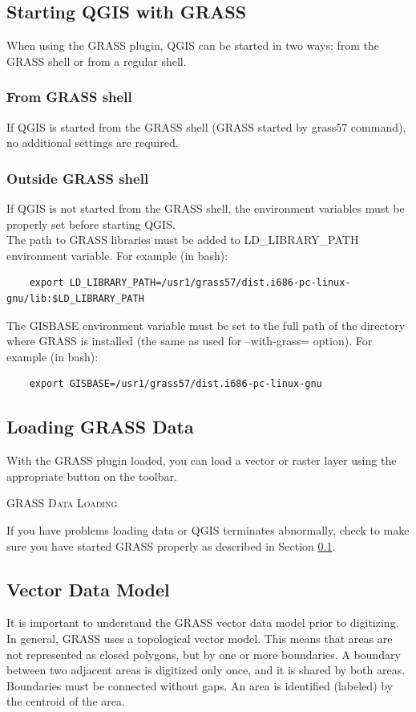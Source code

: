 \documentclass[10pt,english]{article}
\newcommand\qgistip[1]{\raggedright\small{#1}}
\begin{document}
\begin{onehalfspace}
\subsection{Starting QGIS with GRASS}\label{sec:starting_grass}
When using the GRASS plugin, QGIS can be started in two ways: from the GRASS shell or from a regular shell.
\subsubsection{From GRASS shell}

If QGIS is started from the GRASS shell (GRASS started by grass57 command), no additional settings are required. 
\subsubsection{Outside GRASS shell}

If QGIS is not started from the GRASS shell, the environment variables must be properly set before starting QGIS.\\
 
The path to GRASS libraries must be added to LD\_LIBRARY\_PATH environment variable. For example (in bash): 
\begin{verbatim}
    export LD_LIBRARY_PATH=/usr1/grass57/dist.i686-pc-linux-gnu/lib:$LD_LIBRARY_PATH
\end{verbatim}    
 
The GISBASE environment variable must be set to the full path of the directory where GRASS is installed (the same as used for --with-grass= option). For example (in bash):
\begin{verbatim}
    export GISBASE=/usr1/grass57/dist.i686-pc-linux-gnu 
\end{verbatim}
\subsection{Loading GRASS Data}
With the GRASS plugin loaded, you can load a vector or raster layer using the appropriate button on the toolbar. \begin{Tip}\caption{\textsc{GRASS Data Loading}}
\qgistip{If you have problems loading data or QGIS terminates abnormally, check to make sure you have started GRASS properly as described in Section \ref{sec:starting_grass}.
}
\end{Tip} 
\subsection{Vector Data Model}
It is important to understand the GRASS vector data model prior to digitizing. In general,
GRASS uses a topological vector model. This means that areas 
are not represented as closed polygons, but by one or more
boundaries. A boundary between two adjacent areas is digitized
only once, and it is shared by both areas. Boundaries must
be connected without gaps. An area is identified (labeled) by the 
centroid of the area.\\


\end{onehalfspace}
\end{document}
